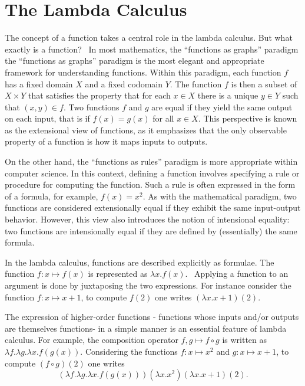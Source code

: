 \section{The Lambda Calculus}

The concept of a function takes a central role in the lambda calculus. But what exactly is a function?  In most mathematics, the “functions as graphs” paradigm the “functions as graphs” paradigm is the most elegant and appropriate framework for understanding functions. Within this paradigm, each function $f$ has a fixed domain $X$ and a fixed codomain $Y$. The function $f$ is then a subset of $X \times Y$ that satisfies the property that for each $x \in X$ there is a unique $y \in Y$ such that $(x,y) \in f$. Two functions $f$ and $g$ are equal if they yield the same output on each input, that is if $f(x) = g(x)$ for all $x \in X$. This perspective is known as the extensional view of functions, as it emphasizes that the only observable property of a function is how it maps inputs to outputs.

On the other hand, the “functions as rules” paradigm is more appropriate within computer science. In this context, defining a function involves specifying a rule or procedure for computing the function. Such a rule is often expressed in the form of a formula, for example, \( f(x) = x^2 \). As with the mathematical paradigm, two functions are considered extensionally equal if they exhibit the same input-output behavior. However, this view also introduces the notion of intensional equality: two functions are intensionally equal if they are defined by (essentially) the same formula.


In the lambda calculus, functions are described explicitly as formulae. The function $f:x \mapsto f(x)$ is represented as $\lambda x.f(x)$.  Applying a function to an argument is done by juxtaposing the two expressions. For instance consider the function $f:x \mapsto x+1$, to compute $f(2)$ one writes $(\lambda x.x+1)(2)$.

The expression of higher‑order functions - functions whose inputs and/or outputs are themselves functions- in a simple manner is an essential feature of lambda calculus. For example, the composition operator $f,g \mapsto f \circ g$ is written as $\lambda f. \lambda g. \lambda x. f(g(x))$. Considering the functions $f:x \mapsto x^2$ and $g:x \mapsto x+1$, to compute $(f \circ g)(2)$ one writes $$(\lambda f. \lambda g. \lambda x. f(g(x)))(\lambda x.x^2)(\lambda x.x+1)(2).$$

